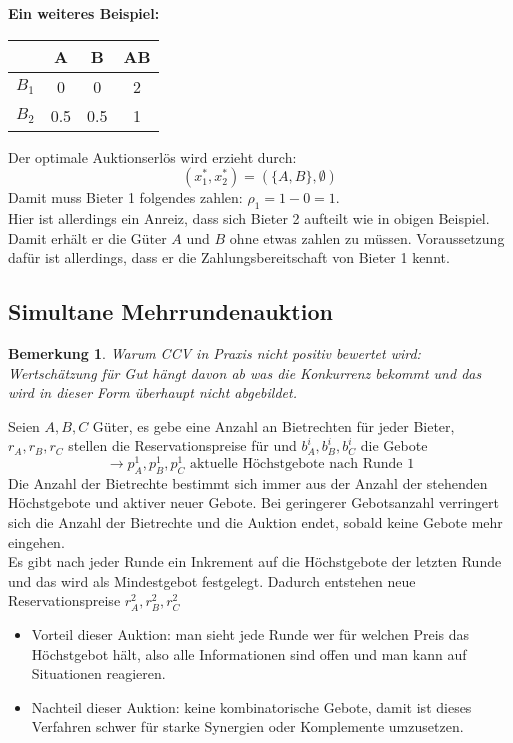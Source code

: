 \documentclass[12pt]{extreport} %
\theoremstyle{named}
\theoremstyle{nnamed}
\theoremstyle{itshape}
\theoremstyle{normal}
\newtheorem*{bemerkung}{Bemerkung}
\begin{document}
\textbf{Ein weiteres Beispiel:} ~\\

\begin{figure*}[h!] \centering
	\begin{tabular}{l|ccc}
		& A & B & AB \\
  			\hline
  		$B_1$ & 0 & 0 & 2  \\
  		$B_2$ & 0.5 & 0.5 & 1  \\
	\end{tabular}
\end{figure*}

Der optimale Auktionserlös wird erzieht durch:
$$ (x_1^*, x_2^*) = \left( \{ A, B \}, \emptyset \right) $$
Damit muss Bieter 1 folgendes zahlen: $\rho_1 = 1 - 0 = 1$. ~\\

Hier ist allerdings ein Anreiz, dass sich Bieter 2 aufteilt wie in obigen Beispiel. Damit erhält er die Güter $A$ und $B$ ohne etwas zahlen zu müssen. Voraussetzung dafür ist allerdings, dass er die Zahlungsbereitschaft von Bieter 1 kennt.


\subsection{Simultane Mehrrundenauktion}

\begin{bemerkung}
	Warum CCV in Praxis nicht positiv bewertet wird: Wertschätzung für Gut hängt davon ab was die Konkurrenz bekommt und das wird in dieser Form überhaupt nicht abgebildet.
\end{bemerkung}

Seien $A, B, C$ Güter, es gebe eine Anzahl an Bietrechten für jeder Bieter, $r_A, r_B, r_C$ stellen die Reservationspreise für und $b_A^i, b_B^i, b_C^i$ die Gebote 
$$ \rightarrow p_A^1, p_B^1, p_C^1 \text{ aktuelle Höchstgebote nach Runde 1} $$
Die Anzahl der Bietrechte bestimmt sich immer aus der Anzahl der stehenden Höchstgebote und aktiver neuer Gebote. Bei geringerer Gebotsanzahl verringert sich die Anzahl der Bietrechte und die Auktion endet, sobald keine Gebote mehr eingehen. ~\\

Es gibt nach jeder Runde ein Inkrement auf die Höchstgebote der letzten Runde und das wird als Mindestgebot festgelegt. Dadurch entstehen neue Reservationspreise  $r_A^2, r_B^2, r_C^2$

\begin{itemize}
	\item Vorteil dieser Auktion: man sieht jede Runde wer für welchen Preis das Höchstgebot hält, also alle Informationen sind offen und man kann auf Situationen reagieren.
	\item Nachteil dieser Auktion: keine kombinatorische Gebote, damit ist dieses Verfahren schwer für starke Synergien oder Komplemente umzusetzen.
\end{itemize}
\end{document}
